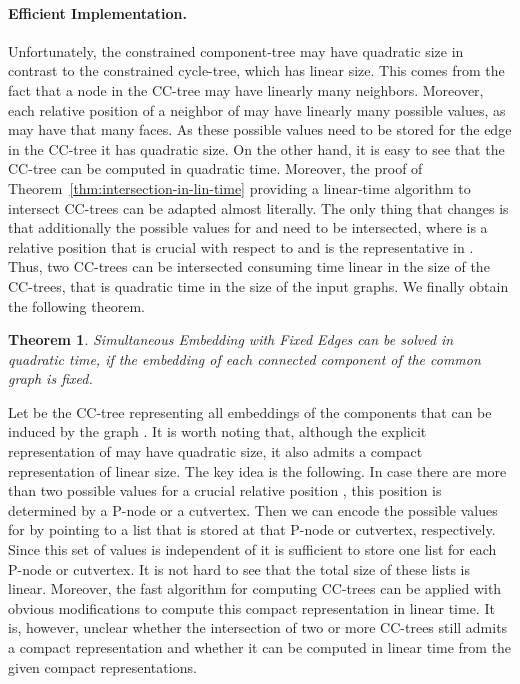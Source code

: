 \documentclass{scrartcl}
\newcommand{\1}[1]{{\normalfont \ensuremath{#1^{\tiny\circled{1}}}}} \newcommand{\2}[1]{{\normalfont \ensuremath{#1^{\tiny\circled{2}}}}} \renewcommand{\k}[1]{{\normalfont \ensuremath{#1^{\tiny\circled{k}}}}} \newcommand{\proj}[2]{\ensuremath{\left.#1\right|_{#2}}} \newcommand{\eps}{\varepsilon}
\theoremstyle{plain} \newtheorem{theorem}{Theorem} \newcounter{lemmacounter} \setcounter{lemmacounter}{0} \newtheorem{lemma}[lemmacounter]{Lemma} \newtheorem{fact}{Fact}  \newtheorem{corollary}{Corollary} \theoremstyle{definition} \newtheorem{definition}{Definition}
\begin{document}
\paragraph{Efficient Implementation.}

Unfortunately, the constrained component-tree may have quadratic size
in contrast to the constrained cycle-tree, which has linear size.
This comes from the fact that a node  in the CC-tree may
have linearly many neighbors.  Moreover, each relative position
 of a neighbor  of  may have linearly many possible
values, as  may have that many faces.  As these possible values
need to be stored for the edge  in the CC-tree it has
quadratic size.  On the other hand, it is easy to see that the CC-tree
can be computed in quadratic time.  Moreover, the proof of
Theorem~\ref{thm:intersection-in-lin-time} providing a linear-time
algorithm to intersect CC-trees can be adapted almost
literally.  The only thing that changes is that additionally the
possible values for  and  need to be
intersected, where  is a relative position that is crucial
with respect to  and  is the
representative in .  Thus, two
CC-trees can be intersected consuming time linear in the size
of the CC-trees, that is quadratic time in the size of the
input graphs.  We finally obtain the following theorem.

\begin{theorem}
  {\sc Simultaneous Embedding with Fixed Edges} can be solved in
  quadratic time, if the embedding of each connected component of the
  common graph is fixed.
\end{theorem}

Let  be the CC-tree representing all
embeddings of the components  that can be induced by the
graph .  It is worth noting that, although the explicit
representation of  may have quadratic size,
it also admits a compact representation of linear size.  The key idea
is the following.  In case there are more than two possible values for
a crucial relative position , this position is determined
by a P-node or a cutvertex.  Then we can encode the possible values
for  by pointing to a list that is stored at that P-node
or cutvertex, respectively.  Since this set of values is independent
of  it is sufficient to store one list for each P-node or
cutvertex.  It is not hard to see that the total size of these lists
is linear.  Moreover, the fast algorithm for computing CC-trees can be
applied with obvious modifications to compute this compact
representation in linear time.  It is, however, unclear whether the
intersection of two or more CC-trees still admits a compact
representation and whether it can be computed in linear time from the
given compact representations.
 
\end{document}
